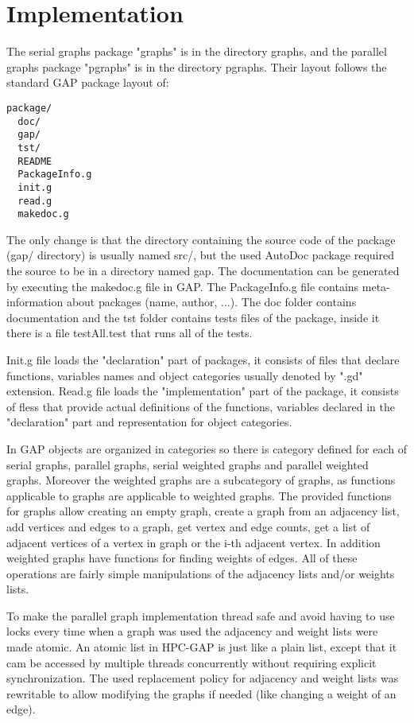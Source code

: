 \documentclass{report}
\theoremstyle{plain}
\theoremstyle{definition}
\theoremstyle{remark}
\begin{document}
\chapter{Implementation}

The serial graphs package "graphs" is in the directory graphs, and the parallel graphs package "pgraphs" is in the directory pgraphs. Their layout follows the standard GAP package layout of:

\begin{lstlisting}
package/
  doc/
  gap/
  tst/
  README
  PackageInfo.g
  init.g
  read.g
  makedoc.g
\end{lstlisting}

The only change is that the directory containing the source code of the package (gap/ directory) is usually named src/, but the used AutoDoc package required the source to be in a directory named gap. The documentation can be generated by executing the makedoc.g file in GAP.
The PackageInfo.g file contains meta-information about packages (name, author, ...). The doc folder contains documentation and the tst folder contains tests files of the package, inside it there is a file testAll.test that runs all of the tests.

Init.g file loads the "declaration" part of packages, it consists of files that declare functions, variables names and object categories usually denoted by ".gd" extension. Read.g file loads the "implementation" part of the package, it consists of fless that provide actual definitions of the functions, variables declared in the "declaration" part and representation for object categories.

In GAP objects are organized in categories so there is category defined for each of serial graphs, parallel graphs, serial weighted graphs and parallel weighted graphs. Moreover the weighted graphs are a subcategory of graphs, as functions applicable to graphs are applicable to weighted graphs. The provided functions for graphs allow creating an empty graph, create a graph from an adjacency list, add vertices and edges to a graph, get vertex and edge counts, get a list of adjacent vertices of a vertex in graph or the i-th adjacent vertex. In addition weighted graphs have functions for finding weights of edges. All of these operations are fairly simple manipulations of the adjacency lists and/or weights lists.

To make the parallel graph implementation thread safe and avoid having to use locks every time when a graph was used the adjacency and weight lists were made atomic. An atomic list in HPC-GAP is just like a plain list, except that it cam be accessed by multiple threads concurrently without requiring explicit synchronization. The used replacement policy for adjacency and weight lists was rewritable to allow modifying the graphs if needed (like changing a weight of an edge).
\end{document}
